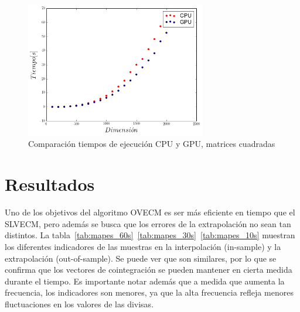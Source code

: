 \begin{figure}[h!t]
    \begin{center}
        \includegraphics[width=0.7\textwidth]{images/speed_up_square}
        \caption{Comparación tiempos de ejecución CPU y GPU, matrices cuadradas}
        \label{fig:speedup_square}
    \end{center}
\end{figure}

\section{Resultados}
Uno de los objetivos del algoritmo OVECM es ser más eficiente en tiempo que el
SLVECM, pero además se busca que los errores de la extrapolación no sean tan
distintos. La tabla~\ref{tab:mapes_60s}~\ref{tab:mapes_30s}~\ref{tab:mapes_10s}
muestran los diferentes indicadores de las muestras en la interpolación
(in-sample) y la extrapolación (out-of-sample). Se puede ver que son similares,
por lo que se confirma que los vectores de cointegración se pueden mantener en
cierta medida durante el tiempo. Es importante notar además que a medida que
aumenta la frecuencia, los indicadores son menores, ya que la alta frecuencia
refleja menores fluctuaciones en los valores de las divisas.

